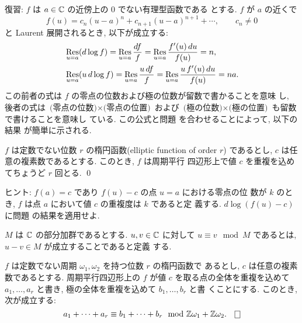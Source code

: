 \documentclass[12pt,twoside]{jarticle}
\def\Z{{\Bbb Z}} %
\def\C{{\Bbb C}} %
\def\Res{\mathop{\text{\rm Res}}} %
\begin{document}
\medskip

\noindent 復習: $f$ は $a\in\C$ の近傍上の $0$ でない有理型函数である
とする. $f$ が $a$ の近くで
\[
  f(u) = c_n(u-a)^n + c_{n+1}(u-a)^{n+1} + \cdots,
  \qquad
  c_n \ne 0
\]
と Laurent 展開されるとき, 以下が成立する:
\begin{align*}
  &
  \Res_{u=a}(d\log f) = 
  \Res_{u=a}\frac{df}{f} =
  \Res_{u=a}\frac{f'(u)\,du}{f(u)} = n,
  \\
  &
  \Res_{u=a}(u\,d\log f) = 
  \Res_{u=a}\frac{u\,df}{f} =
  \Res_{u=a}\frac{u\,f'(u)\,du}{f(u)} = na.
\end{align*}
この前者の式は $f$ の零点の位数および極の位数が留数で書かることを意味
し, 後者の式は $\text{(零点の位数)}\times\text{(零点の位置)}$ および %
$\text{(極の位数)}\times\text{(極の位置)}$ も留数で書けることを意味し
ている. この公式と問題  を合わせることによって, 以下の結果
が簡単に示される. 

\begin{question}\label{q:ef5}\qstar{*}
  $f$ は定数でない位数 $r$ の楕円函数(elliptic function of order $r$)
  であるとし, $c$ は任意の複素数であるとする. このとき, $f$ は周期平行
  四辺形上で値 $c$ を重複を込めてちょうど $r$ 回とる. \qed
\end{question}

\noindent ヒント: $f(a)=c$ であり $f(u)-c$ の点 $u=a$ における零点の位
数が $k$ のとき, $f$ は点 $a$ において値 $c$ の重複度は $k$ であると定
義する. $d\log(f(u)-c)$ に問題  の結果を適用せよ.

\medskip

$M$ は $\C$ の部分加群であるとする. $u,v\in\C$ に対して %
$u\equiv v\mod M$ であるとは, $u-v\in M$ が成立することであると定義
する.

\begin{question}\label{q:ef6}\qstar{*}
  $f$ は定数でない周期 $\omega_1,\omega_2$ を持つ位数 $r$ の楕円函数で
  あるとし, $c$ は任意の複素数であるとする. 
  周期平行四辺形上の $f$ が値 $c$ を取る点の全体を重複を込めて %
  $a_1,\dots,a_r$ と書き, 極の全体を重複を込めて $b_1,\dots,b_r$ と書
  くことにする. このとき, 次が成立する:
  \[
    a_1 + \dots + a_r \equiv b_1 + \dots + b_r
    \mod \Z\omega_1+\Z\omega_2.
  \qed
  \]
\end{question}
\end{document}
